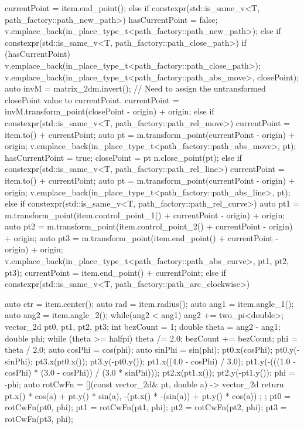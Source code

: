 \begin{codeblock}
{{{        currentPoint = item.end_point();
      }
      else if constexpr(std::is_same_v<T, path_factory::path_new_path>) {
        hasCurrentPoint = false;
        v.emplace_back(in_place_type_t<path_factory::path_new_path>);
      }
      else if constexpr(std::is_same_v<T, path_factory::path_close_path>) {
        if (hasCurrentPoint) {
          v.emplace_back(in_place_type_t<path_factory::path_close_path>);
          v.emplace_back(in_place_type_t<path_factory::path_abs_move>,
            closePoint);
          auto invM = matrix_2d{m}.invert();
          // Need to assign the untransformed closePoint value to currentPoint.
          currentPoint = invM.transform_point(closePoint - origin) + origin;
        }
      }
      else if constexpr(std::is_same_v<T, path_factory::path_rel_move>) {
        currentPoint = item.to() + currentPoint;
        auto pt = m.transform_point(currentPoint - origin) + origin;
        v.emplace_back(in_place_type_t<path_factory::path_abs_move>, pt);
        hasCurrentPoint = true;
        closePoint = pt    
        n.close_point(pt);
      }
      else if constexpr(std::is_same_v<T, path_factory::path_rel_line>) {
        currentPoint = item.to() + currentPoint;
        auto pt = m.transform_point(currentPoint - origin) + origin;
        v.emplace_back(in_place_type_t<path_factory::path_abs_line>, pt);
      }
      else if constexpr(std::is_same_v<T, path_factory::path_rel_curve>) {
        auto pt1 = m.transform_point(item.control_point_1() + currentPoint -
        origin) + origin;
        auto pt2 = m.transform_point(item.control_point_2() + currentPoint -
        origin) + origin;
        auto pt3 = m.transform_point(item.end_point() + currentPoint - origin) +
          origin;
        v.emplace_back(in_place_type_t<path_factory::path_abs_curve>, pt1, pt2,
          pt3);
        currentPoint = item.end_point() + currentPoint;
      }
      else if constexpr(std::is_same_v<T, path_factory::path_arc_clockwise>) {
        auto ctr = item.center();
        auto rad = item.radius();
        auto ang1 = item.angle_1();
        auto ang2 = item.angle_2();
        while(ang2 < ang1) {
          ang2 += two_pi<double>;
        }
        vector_2d pt0, pt1, pt2, pt3;
        int bezCount = 1;
        double theta = ang2 - ang1;
        double phi;
        while (theta >= halfpi) {
          theta /= 2.0;
          bezCount += bezCount;
        }
        phi = theta / 2.0;
        auto cosPhi = cos(phi);
        auto sinPhi = sin(phi);
        pt0.x(cosPhi);
        pt0.y(-sinPhi);
        pt3.x(pt0.x());
        pt3.y(-pt0.y());
        pt1.x((4.0 - cosPhi) / 3.0);
        pt1.y(-(((1.0 - cosPhi) * (3.0 - cosPhi)) / (3.0 * sinPhi)));
        pt2.x(pt1.x());
        pt2.y(-pt1.y());
        phi = -phi;
        auto rotCwFn = [](const vector_2d& pt, double a) -> vector_2d {
          return { pt.x() * cos(a) + pt.y() * sin(a),
            -(pt.x() * -(sin(a)) + pt.y() * cos(a)) };
        };
        pt0 = rotCwFn(pt0, phi);
        pt1 = rotCwFn(pt1, phi);
        pt2 = rotCwFn(pt2, phi);
        pt3 = rotCwFn(pt3, phi);
        
}}}
\end{codeblock}
